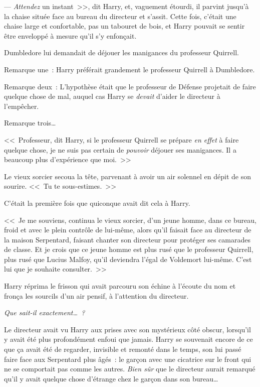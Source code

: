--- \emph{Attendez} un instant~>>, dit Harry, et, vaguement étourdi, il parvint jusqu'à la chaise située face au bureau du directeur et s'assit. Cette fois, c'était une chaise large et confortable, pas un tabouret de bois, et Harry pouvait se sentir être enveloppé à mesure qu'il s'y enfonçait.

Dumbledore lui demandait de déjouer les manigances du professeur Quirrell.

Remarque une~: Harry préférait grandement le professeur Quirrell à Dumbledore.

Remarque deux~: L'hypothèse était que le professeur de Défense projetait de faire quelque chose de mal, auquel cas Harry se \emph{devait} d'aider le directeur à l'empêcher.

Remarque trois…

<<~Professeur, dit Harry, si le professeur Quirrell se prépare \emph{en effet} à faire quelque chose, je ne suis pas certain de \emph{pouvoir} déjouer ses manigances. Il a beaucoup plus d'expérience que moi.~>>

Le vieux sorcier secoua la tête, parvenant à avoir un air solennel en dépit de son sourire. <<~Tu te sous-estimes.~>>

C'était la première fois que quiconque avait dit cela à Harry.

<<~Je me souviens, continua le vieux sorcier, d'un jeune homme, dans ce bureau, froid et avec le plein contrôle de lui-même, alors qu'il faisait face au directeur de la maison Serpentard, faisant chanter son directeur pour protéger ses camarades de classe. Et je crois que ce jeune homme est plus rusé que le professeur Quirrell, plus rusé que Lucius Malfoy, qu'il deviendra l'égal de Voldemort lui-même. C'est lui que je souhaite consulter.~>>

Harry réprima le frisson qui avait parcouru son échine à l'écoute du nom et fronça les sourcils d'un air pensif, à l'attention du directeur.

\emph{Que sait-il exactement…~?}

Le directeur avait vu Harry aux prises avec son mystérieux côté obscur, lorsqu'il y avait été plus profondément enfoui que jamais. Harry se souvenait encore de ce que ça avait été de regarder, invisible et remonté dans le temps, son lui passé faire face aux Serpentard plus âgés~: le garçon avec une cicatrice sur le front qui ne se comportait pas comme les autres. \emph{Bien sûr} que le directeur aurait remarqué qu'il y avait quelque chose d'étrange chez le garçon dans son bureau…

